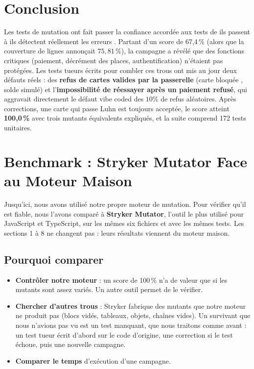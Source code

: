 \documentclass[12pt,a4paper]{article}
\begin{document}
\section{Conclusion}
Les tests de mutation ont fait passer la confiance accordée aux tests de \og ils passent \fg{} à \og ils détectent réellement les erreurs \fg{}. Partant d'un score de 67{,}4\,\% (alors que la couverture de lignes annonçait $75{,}81\,\%$), la campagne a révélé que des fonctions critiques (paiement, décrément des places, authentification) n'étaient pas protégées. Les tests tueurs écrits pour combler ces trous ont mis au jour deux défauts réels : des \textbf{refus de cartes valides par la passerelle} (carte \og bloquée \fg{}, solde simulé) et l'\textbf{impossibilité de réessayer après un paiement refusé}, qui aggravait directement le défaut \og vibe coded \fg{} des $10\%$ de refus aléatoires. Après corrections, une carte qui passe Luhn est toujours acceptée, le score atteint \textbf{100{,}0\,\%} avec trois mutants équivalents expliqués, et la suite comprend 172 tests unitaires.


\newpage
\section{Benchmark : Stryker Mutator Face au Moteur Maison}
Jusqu'ici, nous avons utilisé notre propre moteur de mutation. Pour vérifier qu'il est fiable, nous l'avons comparé à \textbf{Stryker Mutator}, l'outil le plus utilisé pour JavaScript et TypeScript, sur les mêmes six fichiers et avec les mêmes tests. Les sections 1 à 8 ne changent pas : leurs résultats viennent du moteur maison.

\subsection{Pourquoi comparer}
\begin{itemize}
    \item \textbf{Contrôler notre moteur} : un score de 100\,\% n'a de valeur que si les mutants sont assez variés. Un autre outil permet de le vérifier.
    \item \textbf{Chercher d'autres trous} : Stryker fabrique des mutants que notre moteur ne produit pas (blocs vidés, tableaux, objets, chaînes vides). Un survivant que nous n'avions pas vu est un test manquant, que nous traitons comme avant : un test tueur écrit d'abord sur le code d'origine, une correction si le test échoue, puis une nouvelle campagne.
    \item \textbf{Comparer le temps} d'exécution d'une campagne.
\end{itemize}
\end{document}

